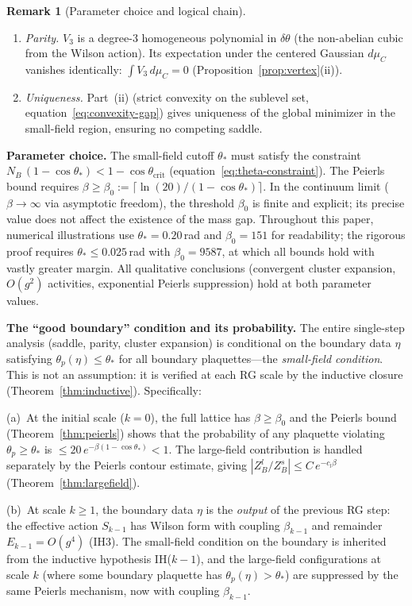 \documentclass[11pt]{article}
\theoremstyle{definition}
\newtheorem{remark}[theorem]{Remark}
\begin{document}
\begin{remark}[Parameter choice and logical chain]
\begin{enumerate}
\item \emph{Parity.}  $V_3$ is a degree-3 homogeneous
polynomial in $\delta\theta$ (the non-abelian cubic from the
Wilson action).  Its expectation under the centered Gaussian
$d\mu_C$ vanishes identically:
$\int V_3\,d\mu_C=0$ (Proposition~\ref{prop:vertex}(ii)).

\item \emph{Uniqueness.}  Part~(ii) (strict convexity on the
sublevel set, equation~\eqref{eq:convexity-gap}) gives
uniqueness of the global minimizer in the
small-field region, ensuring no competing saddle.
\end{enumerate}

\textbf{Parameter choice.}
The small-field cutoff $\theta_*$ must satisfy the constraint
$N_B\,(1-\cos\theta_*)<1-\cos\theta_{\mathrm{crit}}$
(equation~\eqref{eq:theta-constraint}).
The Peierls bound requires
$\beta\ge\beta_0:=\lceil\ln(20)/(1-\cos\theta_*)\rceil$.
In the continuum limit ($\beta\to\infty$ via asymptotic freedom),
the threshold $\beta_0$ is finite and explicit; its precise
value does not affect the existence of the mass gap.
Throughout this paper, numerical illustrations use
$\theta_*=0.20$\,rad and $\beta_0=151$ for readability;
the rigorous proof requires $\theta_*\le 0.025$\,rad
with $\beta_0=9587$, at which all bounds hold with
vastly greater margin.
All qualitative conclusions (convergent cluster expansion,
$O(g^2)$ activities, exponential Peierls suppression) hold
at both parameter values.

\textbf{The ``good boundary'' condition and its probability.}
The entire single-step analysis (saddle, parity, cluster expansion)
is conditional on the boundary data $\eta$ satisfying
$\theta_p(\eta)\le\theta_*$ for all boundary plaquettes---the
\emph{small-field condition}.  This is not an assumption:
it is verified at each RG scale by the inductive closure
(Theorem~\ref{thm:inductive}).  Specifically:

(a)~At the initial scale ($k=0$), the full lattice has $\beta\ge\beta_0$
and the Peierls bound (Theorem~\ref{thm:peierls}) shows that the
probability of any plaquette violating $\theta_p\ge\theta_*$ is
$\le 20\,e^{-\beta(1-\cos\theta_*)}<1$.  The large-field
contribution is handled separately by the Peierls contour estimate,
giving $|Z_B^l/Z_B^s|\le C\,e^{-c_l\beta}$
(Theorem~\ref{thm:largefield}).

(b)~At scale $k\ge 1$, the boundary data $\eta$ is the
\emph{output} of the previous RG step: the effective action
$S_{k-1}$ has Wilson form with coupling $\beta_{k-1}$
and remainder $E_{k-1}=O(g^4)$ (IH3).  The small-field
condition on the boundary is inherited from the inductive
hypothesis IH($k-1$), and the large-field configurations
at scale $k$ (where some boundary plaquette has
$\theta_p(\eta)>\theta_*$) are suppressed by the same
Peierls mechanism, now with coupling $\beta_{k-1}$.


\end{remark}
\end{document}
